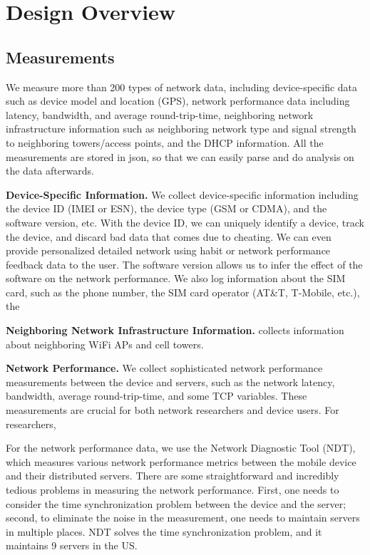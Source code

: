 \section{Design Overview}
\label{s:overview}

\subsection{Measurements}
We measure more than 200 types of network data, including device-specific data such as device model and location (GPS), network performance data including latency, bandwidth, and average round-trip-time, neighboring network infrastructure information such as neighboring network type and signal strength to neighboring towers/access points, and the DHCP information. All the measurements are stored in json, so that we can easily parse and do analysis on the data afterwards.


{\bfseries Device-Specific Information.} We collect device-specific information including the device ID 
(IMEI or ESN), the device type (GSM or CDMA), and the software version, etc. With the device ID, we can 
uniquely identify a device, track the device, and discard bad data that comes due to cheating. We can 
even provide personalized detailed network using habit or network performance feedback data to the user. 
The software version allows us to infer the effect of the software on the network performance. We also 
log information about the SIM card, such as the phone number, the SIM card operator (AT\&T, T-Mobile, etc.),
the 

{\bfseries Neighboring Network Infrastructure Information.} \name{} collects information about
neighboring WiFi APs and cell towers. 

 

{\bfseries Network Performance.} We collect sophisticated network performance measurements between the device
and servers, such as the network latency, bandwidth, average round-trip-time, and some TCP variables. These
measurements are crucial for both network researchers and device users. For researchers, 


For the network performance data, we use the Network Diagnostic Tool (NDT), which measures various network 
performance metrics between the mobile device and their distributed servers. There are some straightforward 
and incredibly tedious problems in measuring the network performance. First, one needs to consider the time 
synchronization problem between the device and the server; second, to eliminate the noise in the measurement, 
one needs to maintain servers in multiple places. NDT solves the time synchronization problem, and it maintains 9 servers in the US.



